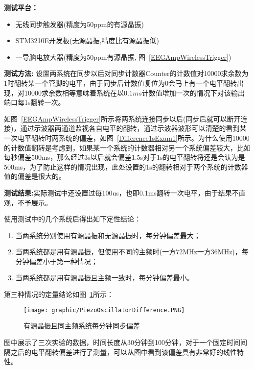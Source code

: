 \textbf{测试平台：}

\begin{itemize}
\item 无线同步触发器(精度为50ppm的有源晶振)
\item		  STM3210E开发板(无源晶振,精度比有源晶振低)
\item		  一导脑电放大器(精度为50ppm有源晶振, 图~\ref{EEGAmpWirelessTrigger})
\end{itemize}

\textbf{测试方法:} 设置两系统在同步以后对同步计数器Counter的计数值对10000求余数为1时翻转某一个管脚的电平，由于同步后计数值复位为0会马上有一个电平翻转出现，对10000求余数相等意味着系统在以$0.1ms$计数值增加一次的情况下对该输出端口每1s翻转一次。

如图~\ref{EEGAmpWirelessTrigger}所示将两系统连接同步以后(同步后就可以断开连接)，通过示波器两通道监视各自电平的翻转，通过示波器波形可以清楚的看到某一次电平翻转时两系统的偏差，如图~\ref{Difference1sExam1}所示。为什么使用10000的计数值翻转是考虑到，如果某一个系统的计数器相对另一个系统偏差较大，比如每秒偏差500ms，那么经过3s以后就会偏差1.5s对于1s的电平翻转将还是会认为是500ms，为了防止这样的情况出现，此处设置的1s的翻转相对于两个系统的计数器值的偏差是很大的。

\textbf{测试结果:}实际测试中还设置过每100us，也即0.1ms翻转一次电平，由于结果不直观，不予展示。

使用测试中的几个系统后得出如下定性结论：

\begin{enumerate}
\item 当两系统分别使用有源晶振和无源晶振时，每分钟偏差最大；
\item 当两系统都是用有源晶振，但使用不同的主频时(一方72MHz一方36MHz)，每分钟偏差小于第一种情况；
\item 当两系统都是用有源晶振且主频一致时，每分钟偏差最小。
\end{enumerate}

第三种情况的定量结论如图~\ref{DifferenceCal}所示：

\begin{figure}[!hbp]
\begin{center}
\texttt{[image: graphic/PiezoOscillatorDifference.PNG]}
\caption{有源晶振且同主频系统每分钟同步偏差 \label{DifferenceCal}}
\end{center}
\end{figure}

图中展示了三次实验的数据，时间长度从30分钟到100分钟，对于一个固定时间间隔之后的电平翻转偏差进行了测量，可以从图中看到该偏差具有非常好的线性特性。

